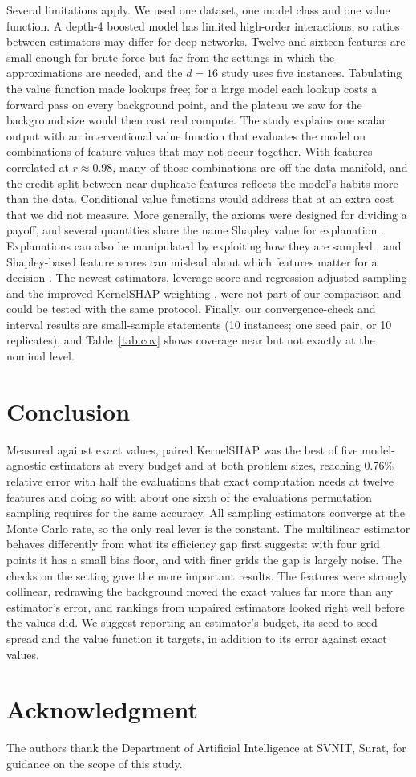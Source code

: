 \documentclass[conference]{IEEEtran}
\begin{document}
Several limitations apply. We used one dataset, one model class and one value function. A depth-4 boosted model has limited high-order interactions, so ratios between estimators may differ for deep networks. Twelve and sixteen features are small enough for brute force but far from the settings in which the approximations are needed, and the $d=16$ study uses five instances. Tabulating the value function made lookups free; for a large model each lookup costs a forward pass on every background point, and the plateau we saw for the background size would then cost real compute. The study explains one scalar output with an interventional value function that evaluates the model on combinations of feature values that may not occur together. With features correlated at $r\approx0.98$, many of those combinations are off the data manifold, and the credit split between near-duplicate features reflects the model's habits more than the data. Conditional value functions \cite{aas2021,frye2021} would address that at an extra cost that we did not measure. More generally, the axioms were designed for dividing a payoff, and several quantities share the name Shapley value for explanation \cite{sundararajan2020many,kumar2020}. Explanations can also be manipulated by exploiting how they are sampled \cite{slack2020}, and Shapley-based feature scores can mislead about which features matter for a decision \cite{huang2024}. The newest estimators, leverage-score and regression-adjusted sampling \cite{musco2025,witter2025} and the improved KernelSHAP weighting \cite{olsen2024}, were not part of our comparison and could be tested with the same protocol. Finally, our convergence-check and interval results are small-sample statements (10 instances; one seed pair, or 10 replicates), and Table~\ref{tab:cov} shows coverage near but not exactly at the nominal level.

\section{Conclusion}
Measured against exact values, paired KernelSHAP was the best of five model-agnostic estimators at every budget and at both problem sizes, reaching 0.76\% relative error with half the evaluations that exact computation needs at twelve features and doing so with about one sixth of the evaluations permutation sampling requires for the same accuracy. All sampling estimators converge at the Monte Carlo rate, so the only real lever is the constant. The multilinear estimator behaves differently from what its efficiency gap first suggests: with four grid points it has a small bias floor, and with finer grids the gap is largely noise. The checks on the setting gave the more important results. The features were strongly collinear, redrawing the background moved the exact values far more than any estimator's error, and rankings from unpaired estimators looked right well before the values did. We suggest reporting an estimator's budget, its seed-to-seed spread and the value function it targets, in addition to its error against exact values.

\section*{Acknowledgment}
The authors thank the Department of Artificial Intelligence at SVNIT, Surat, for guidance on the scope of this study.



\end{document}
